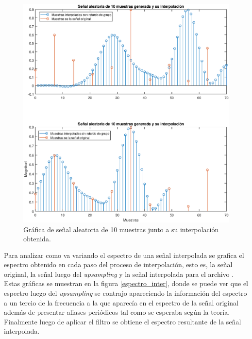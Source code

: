 \begin{enumerate}
    
\begin{figure}[H]
    \centering
    \includegraphics[scale = 0.5]{Figuras/p5_1_interpola.eps}
    \caption{Gráfica de señal aleatoria de 10 muestras junto a su interpolación obtenida.}
    \label{interpola}
\end{figure}
    
    
    Para analizar como va variando el espectro de una señal interpolada  se grafica el espectro obtenido  en  cada paso del proceso de interpolación, esto es, la señal original, la señal luego del \textit{upsampling} y la señal interpolada para el archivo . Estas gráficas se muestran en la figura \ref{espectro_inter}, donde se puede ver que el espectro luego del \textit{upsampling} se contrajo  apareciendo la información del espectro a un tercio de la frecuencia a la que aparecía en el espectro de la señal original además de presentar aliases periódicos tal como se  esperaba según la teoría. Finalmente  luego de aplicar el filtro se obtiene el espectro resultante de la  señal interpolada.
    

\end{enumerate}
